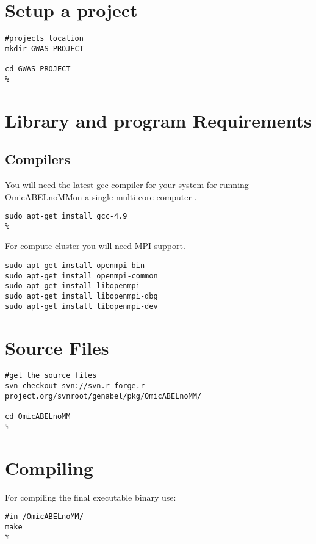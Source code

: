 \documentclass{report}
\newcommand{\oanomm}{OmicABELnoMM}
\begin{document}
\section{Setup a project}
\begin{lstlisting}[escapechar=\%]
#projects location
mkdir GWAS_PROJECT

cd GWAS_PROJECT
%
\end{lstlisting}

\section{Library and program Requirements}


\subsection{Compilers}

You will need the latest gcc compiler for your system for running \oanomm on a single multi-core computer .

\begin{lstlisting}[escapechar=\%]
sudo apt-get install gcc-4.9
%
\end{lstlisting}

For compute-cluster you will need \ac{MPI} support.

\begin{lstlisting}[escapechar=\%]
sudo apt-get install openmpi-bin
sudo apt-get install openmpi-common
sudo apt-get install libopenmpi
sudo apt-get install libopenmpi-dbg
sudo apt-get install libopenmpi-dev
\end{lstlisting}


\section{Source Files}

\begin{lstlisting}[escapechar=\%]
#get the source files
svn checkout svn://svn.r-forge.r-project.org/svnroot/genabel/pkg/OmicABELnoMM/

cd OmicABELnoMM
%
\end{lstlisting}

\section{Compiling}

For compiling the final executable binary use:
\begin{lstlisting}[escapechar=\%]
#in /OmicABELnoMM/
make
%
\end{lstlisting}
\end{document}
